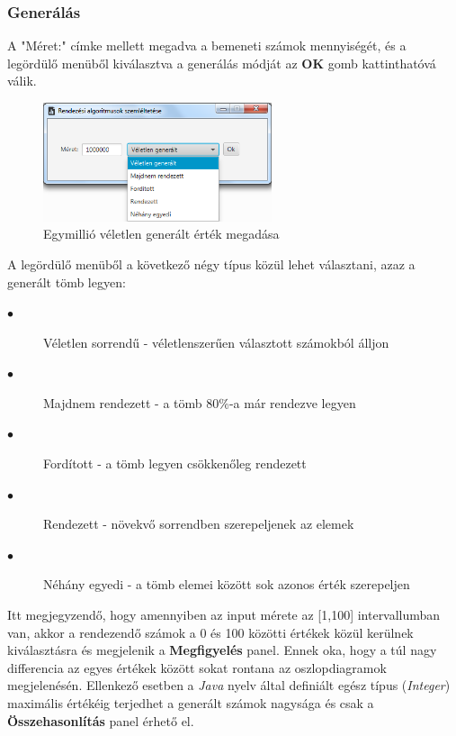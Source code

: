 \documentclass{elteikthesis}
\begin{document}
\subsubsection{Generálás}
A "Méret:" címke mellett megadva a bemeneti számok mennyiségét, és a legördülő menüből kiválasztva a generálás módját az \textbf{OK} gomb kattinthatóvá válik.
\begin{figure}[H]
	\centering
	\includegraphics[width=0.6\textwidth]{pics/randominput.png}
	\caption{Egymillió véletlen generált érték megadása}
\end{figure}
 A legördülő menüből a következő négy típus közül lehet választani, azaz a generált tömb legyen:
\begin{description}
	\item[$\bullet$] Véletlen sorrendű - véletlenszerűen választott számokból álljon
	\item[$\bullet$] Majdnem rendezett - a tömb 80\%-a már rendezve legyen
	\item[$\bullet$] Fordított - a tömb legyen csökkenőleg rendezett
	\item[$\bullet$] Rendezett - növekvő sorrendben szerepeljenek az elemek
	\item[$\bullet$] Néhány egyedi - a tömb elemei között sok azonos érték szerepeljen
\end{description}
\par Itt megjegyzendő, hogy amennyiben az input mérete az [1,100] intervallumban van, akkor a rendezendő számok a 0 és 100 közötti értékek közül kerülnek kiválasztásra és megjelenik a \textbf{Megfigyelés} panel. Ennek oka, hogy a túl nagy differencia az egyes értékek között sokat rontana az oszlopdiagramok megjelenésén. Ellenkező esetben a \emph{Java} nyelv által definiált egész típus (\emph{Integer}) maximális értékéig terjedhet a generált számok nagysága és csak a \textbf{Összehasonlítás} panel érhető el.
 
\end{document}
